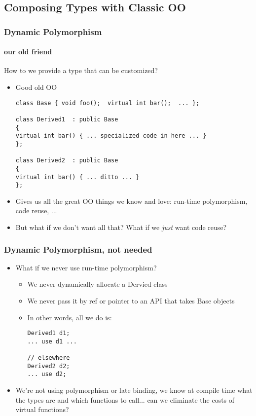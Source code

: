 \subsection{Composing Types with Classic OO}
\begin{frame}[fragile,t]
\frametitle{Dynamic Polymorphism}
\framesubtitle{our old friend}
How to we provide a type that can be customized?
\pause
\begin{itemize}[<+->]
\item Good old OO
{\scriptsize
\begin{verbatim}
class Base { void foo();  virtual int bar();  ... };

class Derived1  : public Base 
{ 
virtual int bar() { ... specialized code in here ... }
};

class Derived2  : public Base 
{ 
virtual int bar() { ... ditto ... }
};

\end{verbatim}
}
\item Gives us all the great OO things we know and love: run-time
  polymorphism, code reuse, ...
\item But what if we don't want all that?  What if we \emph{just} want
  code reuse?
\end{itemize}
\end{frame}

\begin{frame}[fragile,t]
\frametitle{Dynamic Polymorphism, not needed}
\begin{itemize}[<+->]
\item What if we never use run-time polymorphism?  
  \begin{itemize}
  \item We never dynamically allocate a Dervied class
  \item We never pass it by ref or pointer to an API that takes Base objects
  \item In other words, all we do is:
{\scriptsize\begin{verbatim}
Derived1 d1;
... use d1 ...

// elsewhere
Derived2 d2;
... use d2;
\end{verbatim}
}
\end{itemize}
\item We're not using polymorphism or late binding, we know at compile
  time what the types are and which functions to call... can we
  eliminate the costs of virtual functions?

\end{itemize}

\end{frame}


